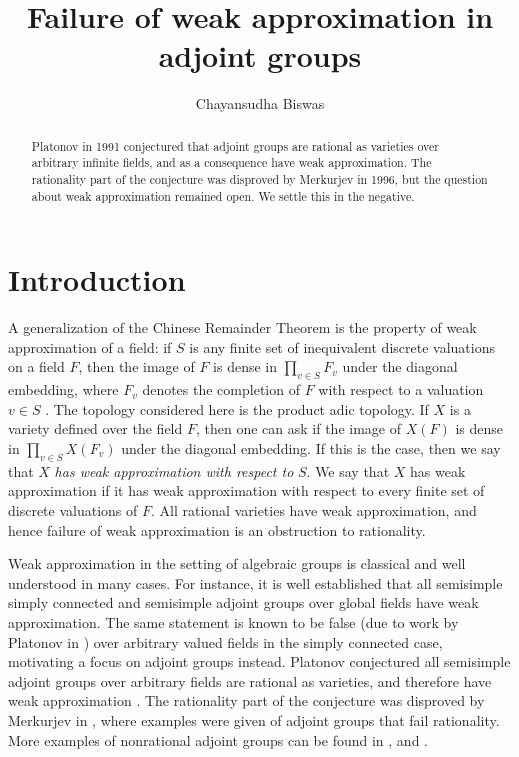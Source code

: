 \documentclass[11pt,letterpaper]{amsart}
\title{Failure of weak approximation in adjoint groups}
\author{Chayansudha Biswas}
\theoremstyle{plain}
\theoremstyle{definition}
\theoremstyle{remark}
\begin{document}
    \maketitle

    \begin{abstract}
        Platonov in 1991 conjectured that adjoint groups are rational as varieties over arbitrary infinite fields, and as a consequence have weak approximation. The rationality part of the conjecture was disproved by Merkurjev in 1996, but the question about weak approximation remained open. We settle this in the negative.

    \end{abstract}

    \section*{Introduction}
    A generalization of the Chinese Remainder Theorem is the property of weak approximation of a field: if $S$ is any finite set of inequivalent discrete valuations on a field $F$, then the image of $F$ is dense in $\prod_{v\in S}F_v$ under the diagonal embedding, where $F_v$ denotes the completion of $F$ with respect to a valuation $v\in S$ \cite[Theorem 1.4]{MR1278263}. The topology considered here is the product adic topology. If $X$ is a variety defined over the field $F$, then one can ask if the image of $X(F)$ is dense in $\prod_{v\in S}X(F_v)$ under the diagonal embedding. If this is the case, then we say that $X$ \textit{has weak approximation with respect to} $S$. We say that $X$ has weak approximation if it has weak approximation with respect to every finite set of discrete valuations of $F$. All rational varieties have weak approximation, and hence failure of weak approximation is an obstruction to rationality.

    Weak approximation in the setting of algebraic groups is classical and well understood in many cases. For instance, it is well established that all semisimple simply connected and semisimple adjoint groups over global fields have weak approximation. The same statement is known to be false (due to work by Platonov in \cite{platonov1976reduced}) over arbitrary valued fields in the simply connected case, motivating a focus on adjoint groups instead. Platonov conjectured all semisimple adjoint groups over arbitrary fields are rational as varieties, and therefore have weak approximation \cite[\S 7.3]{MR1278263}. The rationality part of the conjecture was disproved by Merkurjev in \cite{merkurjev1996r}, where examples were given of adjoint groups that fail rationality. More examples of nonrational adjoint groups can be found in \cite{gille1997examples},  \cite{berhuy2004cohomological} and \cite{bhaskhar2014more}. 
    
\end{document}

